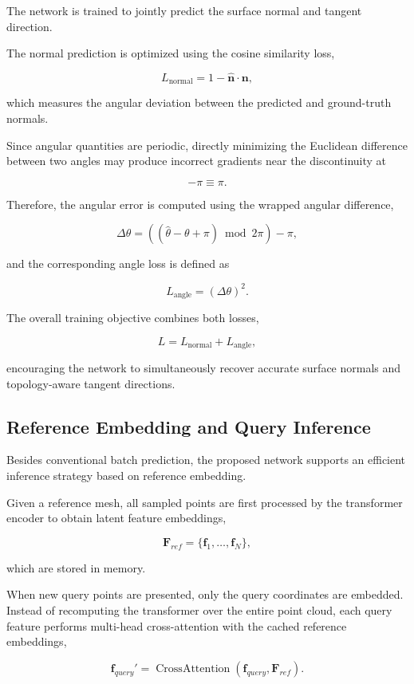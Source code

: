 \documentclass[../main.tex]{subfiles}
\begin{document}
The network is trained to jointly predict the surface normal and tangent direction.

The normal prediction is optimized using the cosine similarity loss,

\[
L_{\mathrm{normal}}
=
1-
\hat{\mathbf n}\cdot\mathbf n,
\]

which measures the angular deviation between the predicted and ground-truth normals.

Since angular quantities are periodic, directly minimizing the Euclidean difference between two angles may produce incorrect gradients near the discontinuity at

\[
-\pi\equiv\pi.
\]

Therefore, the angular error is computed using the wrapped angular difference,

\[
\Delta\theta
=
((\hat{\theta}-\theta+\pi)
\bmod
2\pi)-\pi,
\]

and the corresponding angle loss is defined as

\[
L_{\mathrm{angle}}
=
(\Delta\theta)^2.
\]

The overall training objective combines both losses,

\[
L
=
L_{\mathrm{normal}}
+
L_{\mathrm{angle}},
\]

encouraging the network to simultaneously recover accurate surface normals and topology-aware tangent directions.

\subsection{Reference Embedding and Query Inference}

Besides conventional batch prediction, the proposed network supports an efficient inference strategy based on reference embedding.

Given a reference mesh, all sampled points are first processed by the transformer encoder to obtain latent feature embeddings,

\[
\mathbf{F}_{ref}
=
\{\mathbf{f}_1,\ldots,\mathbf{f}_N\},
\]

which are stored in memory.

When new query points are presented, only the query coordinates are embedded. Instead of recomputing the transformer over the entire point cloud, each query feature performs multi-head cross-attention with the cached reference embeddings,

\[
\mathbf{f}_{query}'
=
\operatorname{CrossAttention}
(
\mathbf{f}_{query},
\mathbf{F}_{ref}
).
\]
\end{document}
